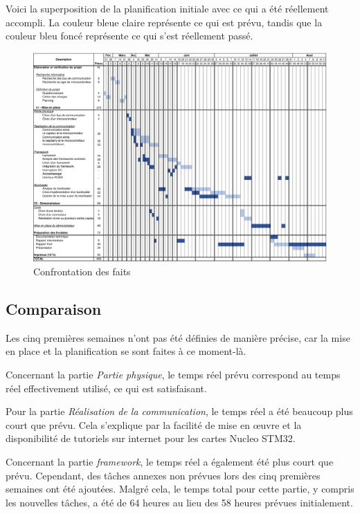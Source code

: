 Voici la superposition de la planification initiale avec ce qui a été réellement accompli. La couleur bleue claire représente ce qui est prévu, tandis que la couleur bleu foncé représente ce qui s'est réellement passé.

\begin{figure}[H]
    \centering
    \includegraphics[angle=90,origin=c,scale=0.54]{./assets/files/planning_reel.pdf}
    \caption{Confrontation des faits}
\end{figure}

\newpage
\subsection{Comparaison}

Les cinq premières semaines n'ont pas été définies de manière précise, car la mise en place et la planification se sont faites à ce moment-là.

Concernant la partie \textit{Partie physique}, le temps réel prévu correspond au temps réel effectivement utilisé, ce qui est satisfaisant.

Pour la partie \textit{Réalisation de la communication}, le temps réel a été beaucoup plus court que prévu.
Cela s'explique par la facilité de mise en \oe{}uvre et la disponibilité de tutoriels sur internet pour les cartes Nucleo STM32.

Concernant la partie \textit{\gls{framework}}, le temps réel a également été plus court que prévu.
Cependant, des tâches annexes non prévues lors des cinq premières semaines ont été ajoutées.
Malgré cela, le temps total pour cette partie, y compris les nouvelles tâches, a été de 64 heures au lieu des 58 heures prévues initialement.

